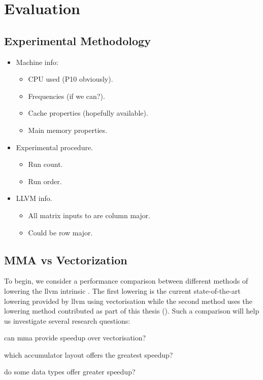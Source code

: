 \documentclass[\main/thesis.tex]{subfiles}
\begin{document}
\chapter{Evaluation}
\section{Experimental Methodology}
\begin{itemize}
  \item
    Machine info:
    \begin{itemize}
      \item CPU used (P10 obviously).
      \item Frequencies (if we can?).
      \item Cache properties (hopefully available).
      \item Main memory properties.
    \end{itemize}
  \item
    Experimental procedure.
    \begin{itemize}
      \item Run count.
      \item Run order.
    \end{itemize}
  \item
    LLVM info.
      \begin{itemize}
        \item All matrix inputs to  are column major.
        \item Could be row major.
      \end{itemize}
\end{itemize}

\section{MMA vs Vectorization}
\label{sec:mmaVsVec}
To begin, we consider a performance comparison between different methods of \gls{lowering} the \gls{llvm} intrinsic .
The first lowering is the current state-of-the-art lowering provided by \gls{llvm} using \gls{vectorisation} while the second method uses the \gls{lowering} method contributed as part of this thesis ().
Such a comparison will help us investigate several research questions:
\begin{enumerate*}[itemjoin*={{ and }}, label=\textbf{(\arabic*)}]
  \item can \gls{mma} provide speedup over \gls{vectorisation}?
  \item which accumulator layout offers the greatest speedup?
  \item do some data types offer greater speedup?
\end{enumerate*}
\end{document}
